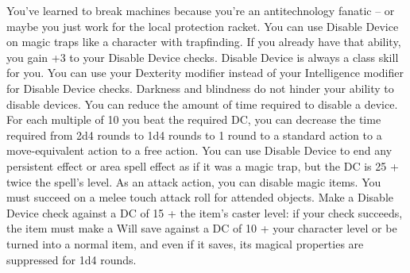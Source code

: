 {You've learned to break machines because you're an antitechnology fanatic -- or maybe you just work for the local protection racket.}
{You can use Disable Device on magic traps like a character with trapfinding. If you already have that ability, you gain +3 to your Disable Device checks. Disable Device is always a class skill for you.}
{You can use your Dexterity modifier instead of your Intelligence modifier for Disable Device checks. Darkness and blindness do not hinder your ability to disable devices.}
{You can reduce the amount of time required to disable a device. For each multiple of 10 you beat the required DC, you can decrease the time required from 2d4 rounds to 1d4 rounds to 1 round to a standard action to a move-equivalent action to a free action.}
{You can use Disable Device to end any persistent effect or area spell effect as if it was a magic trap, but the DC is 25 + twice the spell's level.}
{As an attack action, you can disable magic items. You must succeed on a melee touch attack roll for attended objects. Make a Disable Device check against a DC of 15 + the item's caster level: if your check succeeds, the item must make a Will save against a DC of 10 + \half your character level or be turned into a normal item, and even if it saves, its magical properties are suppressed for 1d4 rounds.}